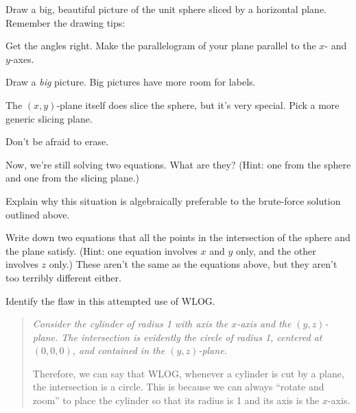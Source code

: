 \documentclass[12pt]{exam}
\begin{document}
\begin{questions}

\question Draw a big, beautiful picture of the unit sphere sliced by a horizontal plane. Remember the drawing tips:
\begin{compactitem}
    \item Get the angles right. Make the parallelogram of your plane parallel to the $x$- and $y$-axes.
    \item Draw a \emph{big} picture. Big pictures have more room for labels.
    \item The $(x,y)$-plane itself does slice the sphere, but it's very special. Pick a more generic slicing plane.
    \item Don't be afraid to erase.
\end{compactitem}


\newpage

\question Now, we're still solving two equations. What are they? (Hint: one from the sphere and one from the slicing plane.)


\question Explain why this situation is algebraically preferable to the brute-force solution outlined above.


\question Write down two equations that all the points in the intersection of the sphere and the plane satisfy. (Hint: one equation involves $x$ and $y$ only, and the other involves $z$ only.) These aren't the same as the equations above, but they aren't too terribly different either.


\question Identify the flaw in this attempted use of WLOG.

\begin{quote}
    {\em Consider the cylinder of radius 1 with axis the $x$-axis and the $(y,z)$-plane. The intersection is evidently the circle of radius 1, centered at $(0,0,0)$, and contained in the $(y,z)$-plane. 

    Therefore, we can say that WLOG, whenever a cylinder is cut by a plane, the intersection is a circle. This is because we can always ``rotate and zoom'' to place the cylinder so that its radius is 1 and its axis is the $x$-axis.}
\end{quote}


\end{questions} 
\end{document}
